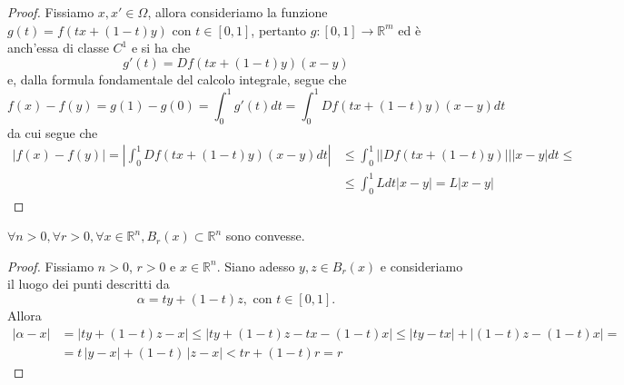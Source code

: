 \begin{proof}
	Fissiamo $x, x' \in \Omega$, allora consideriamo la funzione $g(t) = f(tx + (1-t)y)$ con $t \in [0, 1]$, pertanto $g: [0, 1] \to \mathbb{R}^m$ ed è anch'essa di classe $C^1$ e si ha che
	$$
	g'(t) = Df(tx + (1-t)y)(x - y)
	$$
	e, dalla formula fondamentale del calcolo integrale, segue che 
	$$
	f(x) - f(y) = g(1) - g(0) = \int_0^1 g'(t)dt = \int_0^1 Df(tx + (1-t)y)(x-y)dt
	$$
	da cui segue che
	\begin{align*}
	|f(x) - f(y)| = |\int_0^1 Df(tx + (1-t)y)(x-y)dt| &\leq \int_0^1 || Df(tx + (1-t)y) || |x-y|dt \leq \\
	&\leq \int_0^1 Ldt |x-y| = L|x-y|
	\end{align*}
\end{proof}
\begin{lemma}
    $\forall n > 0, \forall r > 0, \forall x \in \mathbb{R}^n, B_r(x) \subset \mathbb{R}^n$ sono convesse.
\end{lemma}
\begin{proof}
    Fissiamo $n > 0$, $r > 0$ e $x \in \mathbb{R}^n$. Siano adesso $y, z \in B_r(x)$ e consideriamo il luogo dei punti descritti da
    $$
    \alpha = ty + (1-t)z, \text{ con } t \in [0, 1].
    $$
    Allora
    \begin{align*}
    | \alpha - x | &= |ty + (1-t)z - x| \leq |ty + (1-t)z - tx - (1 - t)x| \leq |ty - tx| + |(1-t)z - (1-t)x| = \\
    &=t \, |y - x| + (1-t) \, |z - x| < tr + (1-t)r = r 
    \end{align*}
\end{proof}

